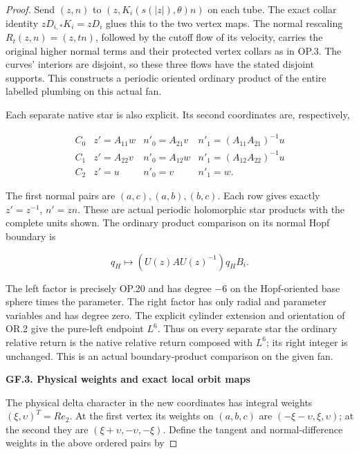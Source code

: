 \begin{proof}
Send \((z,n)\) to \((z,K_i(s(|z|),\theta)n)\) on each tube. The exact
collar identity \(zD_{i,*}K_i=zD_i\) glues this to the two vertex
maps. The normal rescaling \(R_t(z,n)=(z,tn)\), followed by the
cutoff flow of its velocity, carries the original higher normal
terms and their protected vertex collars as in OP.3. The curves'
interiors are disjoint, so these three flows have the stated
disjoint supports. This constructs a periodic oriented ordinary
product of the entire labelled plumbing on this actual fan.

Each separate native star is also explicit. Its second coordinates
are, respectively,

\[
\begin{array}{c|ccc}
 C_0&z'=A_{11}w&n'_0=A_{21}v&n'_1=(A_{11}A_{21})^{-1}u\\
 C_1&z'=A_{22}v&n'_0=A_{12}w&n'_1=(A_{12}A_{22})^{-1}u\\
 C_2&z'=u&n'_0=v&n'_1=w.
\end{array}                                                   \tag{GF.11}
\]

The first normal pairs are \((a,c),(a,b),(b,c)\). Each row gives
exactly \(z'=z^{-1}\), \(n'=zn\). These are actual periodic holomorphic
star products with the complete units shown. The ordinary product
comparison on its normal Hopf boundary is

\[
              q_H\longmapsto (U(z)AU(z)^{-1})q_HB_i.
                                                               \tag{GF.12}
\]

The left factor is precisely OP.20 and has degree \(-6\) on the
Hopf-oriented base sphere times the parameter. The right factor
has only radial and parameter variables and has degree zero.
The explicit cylinder extension and orientation of OR.2 give
the pure-left endpoint \(L^6\). Thus on every separate star the
ordinary relative return is the native relative return composed
with \(L^6\); its right integer is unchanged. This is an actual
boundary-product comparison on the given fan.

\par

\medskip\noindent\textbf{GF.3. Physical weights and exact local orbit maps}

\par\nobreak

The physical delta character in the new coordinates has integral
weights \((\xi,\upsilon)^T=Re_2\). At the first vertex its weights on
\((a,b,c)\) are \((-\xi-\upsilon,\xi,\upsilon)\); at the second they are
\((\xi+\upsilon,-\upsilon,-\xi)\). Define the tangent and normal-difference
weights in the above ordered pairs by


\end{proof}
